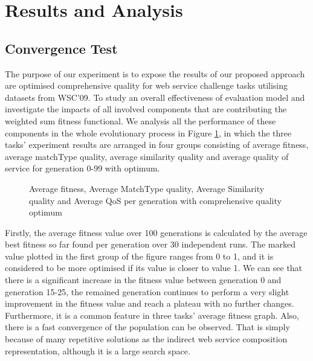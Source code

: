 \documentclass{llncs}
\begin{document}
\section{Results and Analysis}\label{results_analysis}
\subsection{Convergence Test}\label{convergenceTest}
The purpose of our experiment is to expose the results of our proposed approach are optimised comprehensive quality for web service challenge tasks utilising datasets from WSC’09. To study an overall effectiveness of evaluation model and investigate the impacts of all involved components that are contributing the weighted sum fitness functional. We analysis all the performance of these components in the whole evolutionary process in Figure \ref{exp_fitnessvalue}, in which the three tasks' experiment results are arranged in four groups consisting of average fitness, average matchType quality, average similarity quality and average quality of service for generation 0-99 with optimum.
\begin{figure}[h]
\centerline{
}
 \caption{Average fitness, Average MatchType quality, Average Similarity quality and Average QoS per generation with comprehensive quality optimum}
 \label{exp_fitnessvalue}
\end{figure}

Firstly, the average fitness value over 100 generations is calculated by the average best fitness so far found per generation over 30 independent runs. The marked value plotted in the first group of the figure ranges from 0 to 1, and it is considered to be more optimised if its value is closer to value 1. We can see that there is a significant increase in the fitness value between generation 0 and generation 15-25, the remained generation continues to perform a very slight improvement in the fitness value and reach a plateau with no further changes. Furthermore, it is a common feature in three tasks’ average fitness graph. Also, there is a fast convergence of the population can be observed. That is simply because of many repetitive solutions as the indirect web service composition representation, although it is a large search space.
\end{document}
